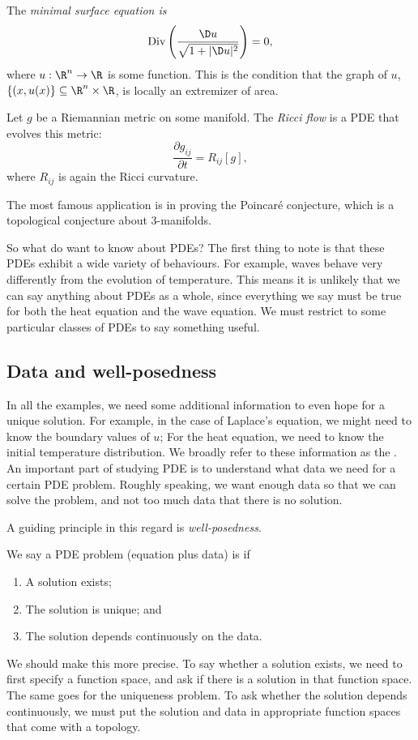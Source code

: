 \documentclass[a4paper]{article}
\begin{document}
\begin{eg}
  The \emph{minimal surface equation is}
  \[
    \mathrm{Div}\left(\frac{\D u}{\sqrt{1 + |\D u|^2}}\right) = 0,
  \]
  where $u: \R^n \to \R$ is some function. This is the condition that the graph of $u$, $\{(x, u(x)\}\subseteq \R^n \times \R$, is locally an extremizer of area.
\end{eg}

\begin{eg}
  Let $g$ be a Riemannian metric on some manifold. The \emph{Ricci flow} is a PDE that evolves this metric:
  \[
    \frac{\partial g_{ij}}{\partial t} = R_{ij}[g],
  \]
  where $R_{ij}$ is again the Ricci curvature.

  The most famous application is in proving the Poincar\'e conjecture, which is a topological conjecture about $3$-manifolds.
\end{eg}

So what do want to know about PDEs? The first thing to note is that these PDEs exhibit a wide variety of behaviours. For example, waves behave very differently from the evolution of temperature. This means it is unlikely that we can say anything about PDEs as a whole, since everything we say must be true for both the heat equation and the wave equation. We must restrict to some particular classes of PDEs to say something useful.

\subsection{Data and well-posedness}
In all the examples, we need some additional information to even hope for a unique solution. For example, in the case of Laplace's equation, we might need to know the boundary values of $u$; For the heat equation, we need to know the initial temperature distribution. We broadly refer to these information as the . An important part of studying PDE is to understand what data we need for a certain PDE problem. Roughly speaking, we want enough data so that we can solve the problem, and not too much data that there is no solution.

A guiding principle in this regard is \emph{well-posedness}.
\begin{defi}
  We say a PDE problem (equation plus data) is  if
  \begin{enumerate}
    \item A solution exists;
    \item The solution is unique; and
    \item The solution depends continuously on the data.
  \end{enumerate}
\end{defi}
We should make this more precise. To say whether a solution exists, we need to first specify a function space, and ask if there is a solution in that function space. The same goes for the uniqueness problem. To ask whether the solution depends continuously, we must put the solution and data in appropriate function spaces that come with a topology.
\end{document}
